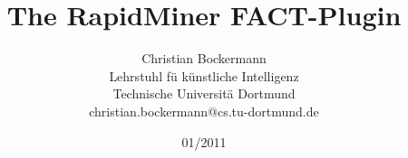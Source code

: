 \documentclass{TechReport}
\date{01/2011}  %
\title{The RapidMiner FACT-Plugin}
\author{Christian Bockermann\\
  Lehrstuhl f\"u k\"unstliche Intelligenz\\
  Technische Universit\"a Dortmund\\
  christian.bockermann@cs.tu-dortmund.de}
\date{}
\begin{document}
\makesfbtitlepage







{}

\end{document}
